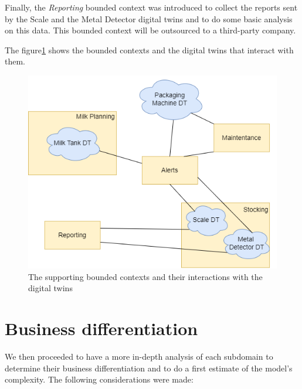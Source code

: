 Finally, the \textit{Reporting} bounded context was introduced to collect the reports sent by the Scale and the Metal Detector digital twins and to do some basic analysis on this data. This bounded context will be outsourced to a third-party company.

The figure\ref{img:subdomains-dt} shows the bounded contexts and the digital twins that interact with them.

\begin{figure}[H]
    \centering
    \includegraphics[width=\textwidth]{img/subdomains-dt.png}
    \caption{The supporting bounded contexts and their interactions with the digital twins}
    \label{img:subdomains-dt}
\end{figure}

\section{Business differentiation}
We then proceeded to have a more in-depth analysis of each subdomain to determine their business differentiation and to do a first estimate of the model's complexity. The following considerations were made:


